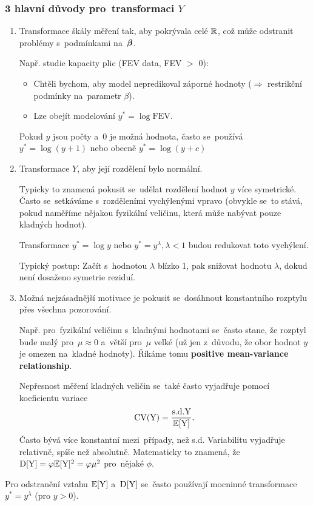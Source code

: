 \subsubsection*{3 hlavní důvody pro~transformaci $Y$ }
\begin{enumerate}
	\item Transformace škály měření tak, aby pokrývala celé $\mathbb{R}$, což může odstranit problémy s~podmínkami na~$\boldsymbol{\beta}$.
	
	Např. studie kapacity plic (FEV data, FEV $>$ 0):
	\begin{itemize}
		\item Chtěli bychom, aby model nepredikoval záporné hodnoty ($\Rightarrow$ restrikční podmínky na~parametr $\beta$).
		\item Lze obejít modelování $y^* = \log \mathrm{FEV}$.
	\end{itemize}

	Pokud $y$ jsou počty a~0 je možná hodnota, často se~používá $y^* = \log (y+1)$ nebo obecně $y^* = \log(y + c)$
	
	\item Transformace $Y$, aby její rozdělení bylo  normální.
	
	Typicky to znamená pokusit se~udělat rozdělení hodnot $y$ více symetrické. Často se~setkáváme s~rozděleními vychýlenými vpravo (obvykle se~to stává, pokud naměříme nějakou fyzikální veličinu, která může nabývat pouze kladných hodnot).
	
	Transformace $y^* = \log y$ nebo $y^* = y^{\lambda}, \lambda < 1$ budou redukovat toto vychýlení.
	
	Typický postup: Začít s~hodnotou $\lambda$ blízko 1, pak snižovat hodnotu $\lambda$, dokud není dosaženo  symetrie reziduí.
	
	\item Možná nejzásadnější motivace je pokusit se~dosáhnout konstantního rozptylu přes všechna pozorování.
	
	Např. pro~fyzikální veličinu s~kladnými hodnotami se~často stane, že rozptyl bude malý pro~$\mu \approx 0$ a~větší pro~$\mu$ velké (už jen z~důvodu, že obor hodnot $y$ je omezen na~kladné hodnoty). Říkáme tomu \textbf{positive mean-variance relationship}.
	
  Nepřesnost měření kladných veličin se~také často vyjadřuje pomocí koeficientu variace
 $$
 \text{CV}(\text{Y}) = \frac{\text{s.d.} \text{Y}}{\mathbb{E}[\text{Y}]}.
 $$
Často bývá více konstantní mezi~případy, než s.d. Variabilitu vyjadřuje relativně, spíše než absolutně. Matematicky to znamená, že $\mathrm{D}[\text{Y}] = \varphi \mathbb{E}[\text{Y}]^2 = \varphi \mu^2$ pro~nějaké $\phi$.

\end{enumerate}Pro odstranění vztahu $\mathbb{E} [\text{Y}]$ a~$\mathrm{D}[\text{Y}]$ se~často používají mocninné transformace $y^* = y^{\lambda}$ (pro $y > 0$).

